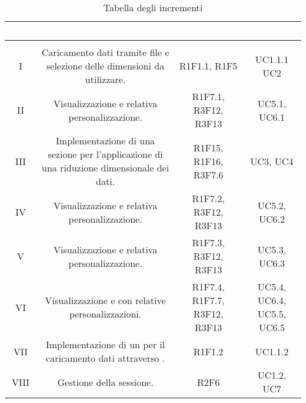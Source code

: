 \newpage
{
\setlength\arrayrulewidth{1pt}
\setlength\colA{1.5cm}
\setlength\colB{8cm}
\setlength\colC{4cm}
\setlength\colD{2cm}
\setlength\total{\dimexpr\colA+\colB+\colC+\colD+6\tabcolsep\relax}
\begin{longtable}{C{\colA} | C{\colB} | C{\colC} | C{\colD}}
		\textcolor{white}{\textbf{Incr.}} & 
		\textcolor{white}{\textbf{Obiettivo}} & 
		\textcolor{white}{\textbf{Requisiti}} & 
		\textcolor{white}{\textbf{Casi d'uso}} \\
		\endfirsthead
	    \\
	    \endfoot
	    \caption{Tabella degli incrementi}
	    \endlastfoot

I &
Caricamento dati tramite file e selezione delle dimensioni da utilizzare.& 
R1F1.1, R1F5 & 
UC1.1.1 \newline UC2\\
II &
Visualizzazione  e relativa personalizzazione.& 
R1F7.1, R3F12, R3F13 & 
UC5.1, UC6.1\\
III & 
Implementazione di una sezione per l'applicazione di una riduzione dimensionale dei dati. & 
R1F15, R1F16, R3F7.6& 
UC3, UC4\\
IV & 
Visualizzazione  e relativa personalizzazione. & 
R1F7.2, R3F12, R3F13 & 
UC5.2, UC6.2\\
V & 
Visualizzazione  e relativa personalizzazione. & 
R1F7.3, R3F12, R3F13& 
UC5.3, UC6.3\\
VI & 
Visualizzazione  e  con relative personalizzazioni. & 
R1F7.4, R1F7.7, R3F12, R3F13& 
UC5.4, UC6.4, UC5.5, UC6.5\\
VII & 
Implementazione di un  per il caricamento dati attraverso . & 
R1F1.2 & 
UC1.1.2\\

VIII & 
Gestione della sessione. & 
R2F6 & 
UC1.2, UC7\\


\end{longtable}
}